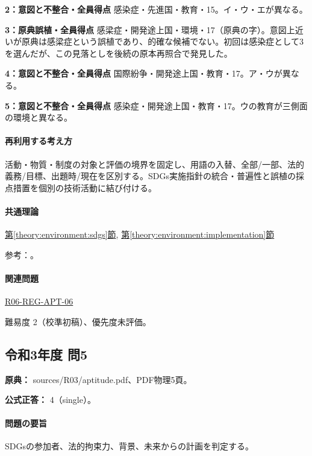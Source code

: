 \noindent\textbf{2：意図と不整合・全員得点} 感染症・先進国・教育・15。イ・ウ・エが異なる。\par

\noindent\textbf{3：原典誤植・全員得点} 感梁症・開発途上国・環境・17（原典の字）。意図上近いが原典は感梁症という誤植であり、的確な候補でない。初回は感染症として3を選んだが、この見落としを後続の原本再照合で発見した。\par

\noindent\textbf{4：意図と不整合・全員得点} 国際紛争・開発途上国・教育・17。ア・ウが異なる。\par

\noindent\textbf{5：意図と不整合・全員得点} 感染症・開発途上国・教育・17。ウの教育が三側面の環境と異なる。\par

\paragraph{再利用する考え方} 活動・物質・制度の対象と評価の境界を固定し、用語の入替、全部/一部、法的義務/目標、出題時/現在を区別する。SDGs実施指針の統合・普遍性と誤植の採点措置を個別の技術活動に結び付ける。

\paragraph{共通理論} \hyperref[theory:environment:sdgs]{第\ref*{theory:environment:sdgs}節}, \hyperref[theory:environment:implementation]{第\ref*{theory:environment:implementation}節}

\par 参考：\cite{env_sdgs2016}。

\paragraph{関連問題} \hyperref[q:r06-reg-apt-06]{R06-REG-APT-06}

\par 難易度 2（校準初稿）、優先度未評価。

\subsection{令和3年度 問5}
\label{q:r03-reg-apt-05}

\noindent\textbf{原典：} sources/R03/aptitude.pdf、PDF物理5頁。

\textbf{公式正答：} 4（single）。

\paragraph{問題の要旨} SDGsの参加者、法的拘束力、背景、未来からの計画を判定する。

